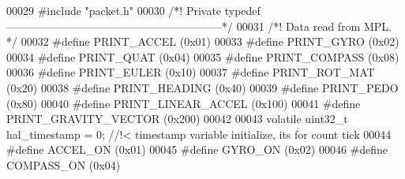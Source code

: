\begin{DoxyCode}
00029 \textcolor{preprocessor}{#}\textcolor{preprocessor}{include} \textcolor{preprocessor}{"packet.h"}
00030 \textcolor{comment}{/*! Private typedef -----------------------------------------------------------*/}
00031 \textcolor{comment}{/*! Data read from MPL. */}
00032 \textcolor{preprocessor}{#}\textcolor{preprocessor}{define} \textcolor{preprocessor}{PRINT\_ACCEL}     \textcolor{preprocessor}{(}0x01\textcolor{preprocessor}{)}
00033 \textcolor{preprocessor}{#}\textcolor{preprocessor}{define} \textcolor{preprocessor}{PRINT\_GYRO}      \textcolor{preprocessor}{(}0x02\textcolor{preprocessor}{)}
00034 \textcolor{preprocessor}{#}\textcolor{preprocessor}{define} \textcolor{preprocessor}{PRINT\_QUAT}      \textcolor{preprocessor}{(}0x04\textcolor{preprocessor}{)}
00035 \textcolor{preprocessor}{#}\textcolor{preprocessor}{define} \textcolor{preprocessor}{PRINT\_COMPASS}   \textcolor{preprocessor}{(}0x08\textcolor{preprocessor}{)}
00036 \textcolor{preprocessor}{#}\textcolor{preprocessor}{define} \textcolor{preprocessor}{PRINT\_EULER}     \textcolor{preprocessor}{(}0x10\textcolor{preprocessor}{)}
00037 \textcolor{preprocessor}{#}\textcolor{preprocessor}{define} \textcolor{preprocessor}{PRINT\_ROT\_MAT}   \textcolor{preprocessor}{(}0x20\textcolor{preprocessor}{)}
00038 \textcolor{preprocessor}{#}\textcolor{preprocessor}{define} \textcolor{preprocessor}{PRINT\_HEADING}   \textcolor{preprocessor}{(}0x40\textcolor{preprocessor}{)}
00039 \textcolor{preprocessor}{#}\textcolor{preprocessor}{define} \textcolor{preprocessor}{PRINT\_PEDO}      \textcolor{preprocessor}{(}0x80\textcolor{preprocessor}{)}
00040 \textcolor{preprocessor}{#}\textcolor{preprocessor}{define} \textcolor{preprocessor}{PRINT\_LINEAR\_ACCEL} \textcolor{preprocessor}{(}0x100\textcolor{preprocessor}{)}
00041 \textcolor{preprocessor}{#}\textcolor{preprocessor}{define} \textcolor{preprocessor}{PRINT\_GRAVITY\_VECTOR} \textcolor{preprocessor}{(}0x200\textcolor{preprocessor}{)}
00042 
00043 \textcolor{keyword}{volatile} uint32\_t hal_timestamp = 0; \textcolor{comment}{//!< timestamp variable initialize, its for count tick}
00044 \textcolor{preprocessor}{#}\textcolor{preprocessor}{define} \textcolor{preprocessor}{ACCEL\_ON}        \textcolor{preprocessor}{(}0x01\textcolor{preprocessor}{)}
00045 \textcolor{preprocessor}{#}\textcolor{preprocessor}{define} \textcolor{preprocessor}{GYRO\_ON}         \textcolor{preprocessor}{(}0x02\textcolor{preprocessor}{)}
00046 \textcolor{preprocessor}{#}\textcolor{preprocessor}{define} \textcolor{preprocessor}{COMPASS\_ON}      \textcolor{preprocessor}{(}0x04\textcolor{preprocessor}{)}

\end{DoxyCode}
